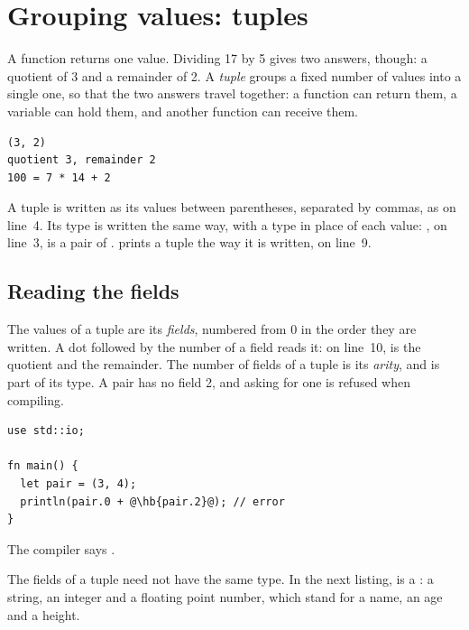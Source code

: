\vfill\pagebreak
\section{Grouping values: tuples}
\label{sec:collections:tuples}

A function returns one value. Dividing 17 by 5 gives two answers, though: a
quotient of 3 and a remainder of 2. A \textit{tuple} groups a fixed number of
values into a single one, so that the two answers travel together: a function
can return them, a variable can hold them, and another function can receive
them.


\vspace{-10pt}%
\begin{lstlisting}[style=bashVerb]
(3, 2)
quotient 3, remainder 2
100 = 7 * 14 + 2
\end{lstlisting}

A tuple is written as its values between parentheses, separated by commas, as
 on line~4. Its type is written the same way, with a type
in place of each value: , on line~3, is a pair of
.  prints a tuple the way it is written, on line~9.

\subsection{Reading the fields}

The values of a tuple are its \textit{fields}, numbered from 0 in the order they
are written. A dot followed by the number of a field reads it: on line~10,
 is the quotient and  the remainder. The number
of fields of a tuple is its \textit{arity}, and is part of its type. A pair has
no field 2, and asking for one is refused when compiling.

\begin{lstlisting}[style=coloredverbatimError, escapechar=@, caption=A field that does not exist]
use std::io;

fn main() {
  let pair = (3, 4);
  println(pair.0 + @\hb{pair.2}@); // error
}
\end{lstlisting}

The compiler says .

The fields of a tuple need not have the same type. In the next listing,
 is a : a string, an integer and a
floating point number, which stand for a name, an age and a height.

